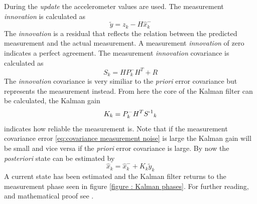 \documentclass[a4paper,11pt]{kth-mag}
\begin{document}
During the \textit{update} the accelerometer values are used. The measurement \textit{innovation} is calculated as
\begin{equation}
\tilde{y} = z_k - H\hat{x}^-_k
\end{equation}
The \textit{innovation} is a residual that reflects the relation between the predicted measurement and the actual measurement. A measurement \textit{innovation} of zero indicates a perfect agreement.
The measurement \textit{innovation} covariance is calculated as
\begin{equation}
S_k = HP^-_kH^T + R
\end{equation}
The \textit{innovation} covariance is very similiar to the \textit{priori} error covariance but represents the measurement instead. From here the core of the Kalman filter can be calculated, the Kalman gain
\begin{equation} \label{eq:Kalman gain}
K_k = P^-_kH^TS\textsuperscript{-1}_k
\end{equation}
indicates how reliable the measurement is. Note that if the measurement covariance error \eqref{eq:covariance measurement noise} is large the Kalman gain will be small and vice versa if the \textit{priori} error covariance is large.
By now the \textit{posteriori} state can be estimated by
\begin{equation}
\hat{x}_k = \hat{x}^-_k + K_k\tilde{y}_k
\end{equation}
A current state has been estimated and the Kalman filter returns to the measurement phase seen in figure \ref{figure : Kalman phases}.
For further reading, and mathematical proof see \cite{Kalmanintro}.
\end{document}
